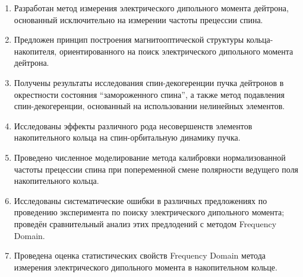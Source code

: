 
\begin{enumerate}
	\item Разработан метод измерения электрического дипольного момента дейтрона, 
	основанный исключительно на измерении частоты прецессии спина.
	\item Предложен принцип построения магнитооптической структуры кольца-накопителя, 
	ориентированного на поиск электрического дипольного момента дейтрона.
	\item Получены результаты исследования спин-декогеренции пучка дейтронов в окрестности 
	состояния ``замороженного спина'', а также метод подавления спин-декогеренции, основанный на использовании нелинейных элементов.
	\item Исследованы эффекты различного рода несовершенств элементов накопительного кольца 
	на спин-орбитальную динамику пучка.
	\item Проведено численное моделирование метода калибровки нормализованной частоты прецессии спина 
	при попеременной смене полярности ведущего поля накопительного кольца.
	\item Исследованы систематические ошибки в различных предложениях по проведению эксперимента 
	по поиску электрического дипольного момента; проведён сравнительный анализ этих предлодений 
	с методом Frequency Domain.
	\item Проведена оценка статистических свойств Frequency Domain метода измерения 
	электрического дипольного момента в накопительном кольце.
\end{enumerate}
